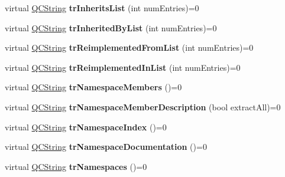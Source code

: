 \begin{DoxyCompactItemize}
\item 
\hypertarget{class_translator_ab55ef69cf422b5ccef8136424f2204da}{virtual \hyperlink{class_q_c_string}{Q\-C\-String} {\bfseries tr\-Inherits\-List} (int num\-Entries)=0}\label{class_translator_ab55ef69cf422b5ccef8136424f2204da}

\item 
\hypertarget{class_translator_a06b209131ddd17778480f9818dca12d4}{virtual \hyperlink{class_q_c_string}{Q\-C\-String} {\bfseries tr\-Inherited\-By\-List} (int num\-Entries)=0}\label{class_translator_a06b209131ddd17778480f9818dca12d4}

\item 
\hypertarget{class_translator_a3ac53b8305440dc6cb5042efd4b01a6e}{virtual \hyperlink{class_q_c_string}{Q\-C\-String} {\bfseries tr\-Reimplemented\-From\-List} (int num\-Entries)=0}\label{class_translator_a3ac53b8305440dc6cb5042efd4b01a6e}

\item 
\hypertarget{class_translator_a3ecd3d7fc08c9d1bbcb2bbe2bdfec418}{virtual \hyperlink{class_q_c_string}{Q\-C\-String} {\bfseries tr\-Reimplemented\-In\-List} (int num\-Entries)=0}\label{class_translator_a3ecd3d7fc08c9d1bbcb2bbe2bdfec418}

\item 
\hypertarget{class_translator_a6d12c2028ce36e0655ce3acc89635665}{virtual \hyperlink{class_q_c_string}{Q\-C\-String} {\bfseries tr\-Namespace\-Members} ()=0}\label{class_translator_a6d12c2028ce36e0655ce3acc89635665}

\item 
\hypertarget{class_translator_add789f1f5f28b1cdb460d747031ec010}{virtual \hyperlink{class_q_c_string}{Q\-C\-String} {\bfseries tr\-Namespace\-Member\-Description} (bool extract\-All)=0}\label{class_translator_add789f1f5f28b1cdb460d747031ec010}

\item 
\hypertarget{class_translator_a8bc742e0a05f2abb36fbd0dea256c338}{virtual \hyperlink{class_q_c_string}{Q\-C\-String} {\bfseries tr\-Namespace\-Index} ()=0}\label{class_translator_a8bc742e0a05f2abb36fbd0dea256c338}

\item 
\hypertarget{class_translator_a70de41b657b6e6fd7647357cef9a6331}{virtual \hyperlink{class_q_c_string}{Q\-C\-String} {\bfseries tr\-Namespace\-Documentation} ()=0}\label{class_translator_a70de41b657b6e6fd7647357cef9a6331}

\item 
\hypertarget{class_translator_af026dc987ae247f2a7e9037fb73e7f74}{virtual \hyperlink{class_q_c_string}{Q\-C\-String} {\bfseries tr\-Namespaces} ()=0}\label{class_translator_af026dc987ae247f2a7e9037fb73e7f74}


\end{DoxyCompactItemize}
